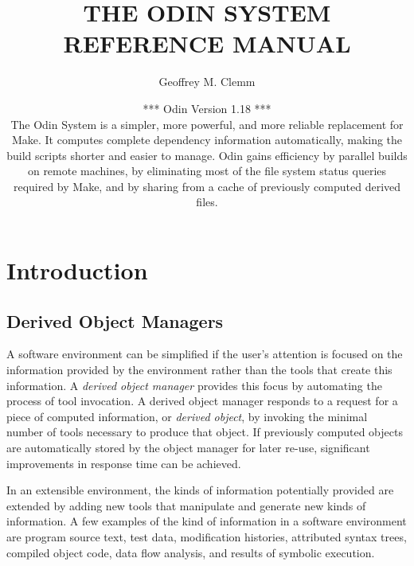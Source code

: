 \topmargin -0.25in
\textheight 8.75in
\oddsidemargin 0.0in
\textwidth 6.5in
\addtocounter{tocdepth}{1}
\addtocounter{secnumdepth}{1}
\newcommand{\ex}{\tt}   %
\title{
        THE ODIN SYSTEM\\ \vspace{.5in}
        REFERENCE MANUAL
        }
\author{Geoffrey M. Clemm}
\date{
*** Odin Version 1.18 ***\\
The Odin System is a simpler, more powerful, and more reliable
replacement for Make.  It computes complete dependency information
automatically, making the build scripts shorter and easier to manage.
Odin gains efficiency by parallel builds on remote machines,
by eliminating most of the file system status queries required
by Make, and by sharing from a cache of previously computed derived files.
}



\maketitle

\tableofcontents


\chapter{Introduction}
\label{intro}


\section{Derived Object Managers}

A software environment can be simplified if the
user's attention is focused on the information provided by the environment
rather than the tools that create this information.
A {\em derived object manager} provides this focus
by automating the process of tool invocation.
A derived object manager responds to a request for a piece of computed
information,
or {\em derived object}, by invoking the minimal number of tools
necessary to produce that object.
If previously computed objects are automatically stored by the object manager
for later re-use, significant improvements in response time can be achieved.

In an extensible environment, the kinds of information potentially
provided are extended by adding
new tools that manipulate and generate new kinds of information.
A few examples of the kind of information in a software environment
are program source text, test data, modification histories,
attributed syntax trees, compiled object code, data flow analysis,
and results of symbolic execution.

